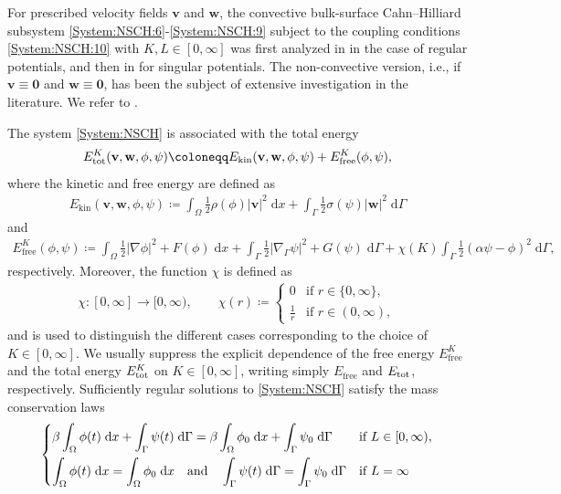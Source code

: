 \documentclass[11pt,reqno]{amsart}
\theoremstyle{remark}
\numberwithin{equation}{section}
\newcommand{\abs}[1]{|#1|}
\newcommand{\intO}{\int_\Omega}
\newcommand{\intG}{\int_\Gamma}
\newcommand{\dx}{\;\mathrm{d}x}
\newcommand{\dG}{\;\mathrm d\Ga}
\newcommand{\Grad}{\nabla}
\newcommand{\Gradg}{\nabla_\Ga}
\newcommand{\Ga}{\Gamma}
\newcommand{\bv}{\mathbf v}
\newcommand{\bw}{\mathbf w}
\newcommand{\tot}{\textup{tot}}
\newcommand{\free}{\mathrm{free}}
\begin{document}
For prescribed velocity fields $\bv$ and $\bw$, the convective bulk-surface Cahn--Hilliard subsystem \eqref{System:NSCH:6}-\eqref{System:NSCH:9} subject to the coupling conditions \eqref{System:NSCH:10} with $K,L\in[0,\infty]$ was first analyzed in \cite{Knopf2024} in the case of regular potentials, and then in \cite{Knopf2025a,Giorgini2026,Stange2026,Knopf2026} for singular potentials. The non-convective version, i.e., if $\bv\equiv\mathbf 0$ and $\bw\equiv\mathbf 0$, has been the subject of extensive investigation in the literature. We refer to \cite{Lv2024,Lv2024a,Lv2024b,Stange2026,Fukao2021,Colli2020,Goldstein2011,Liu2019,Knopf2020,Knopf2021a}.


The system \eqref{System:NSCH} is associated with the total energy
\begin{align*}
	E^K_\tot(\bv,\bw,\phi,\psi) \coloneqq E_{\mathrm{kin}}(\bv,\bw,\phi,\psi) + E_\free^K(\phi,\psi),
\end{align*}
where the kinetic and free energy are defined as
\begin{align*}
    E_{\mathrm{kin}}(\bv,\bw,\phi,\psi) \coloneqq \intO \frac12\rho(\phi)\abs{\bv}^2\dx + \intG \frac12\sigma(\psi)\abs{\bw}^2\dG
\end{align*}
and
\begin{align*}
    E_\free^K(\phi,\psi) \coloneqq \intO \frac12\abs{\Grad\phi}^2 + F(\phi)\dx + \intG \frac12\abs{\Gradg\psi}^2 + G(\psi)\dG + \chi(K)\intG \frac12(\alpha\psi - \phi)^2\dG,
\end{align*}
respectively.
Moreover, the function $\chi$ is defined as
\begin{align}\label{DEF:CHI}
    \chi:[0,\infty]\rightarrow[0,\infty), \qquad \chi(r) \coloneqq \begin{cases} 0 & \text{if~}r\in\{0,\infty\}, \\
    \frac1r &\text{if~}r\in(0,\infty),
    \end{cases}
\end{align}
and is used to distinguish the different cases corresponding to the choice of $K\in[0,\infty]$. We usually suppress the explicit dependence of the free energy $E_\free^K$ and the total energy $E_\tot^K$ on $K\in[0,\infty]$, writing simply $E_\free$ and $E_\tot$, respectively. Sufficiently regular solutions to \eqref{System:NSCH} satisfy the mass conservation laws
\begin{align}\label{Intro:MCL}
    \begin{dcases}
        \beta\intO \phi(t)\dx + \intG \psi(t)\dG = \beta\intO \phi_0 \dx + \intG \psi_0\dG &\textnormal{if~} L\in[0,\infty), \\
        \intO\phi(t)\dx = \intO\phi_0\dx \quad\textnormal{and}\quad \intG\psi(t)\dG = \intG\psi_0\dG &\textnormal{if~} L = \infty
    \end{dcases}
\end{align}
\end{document}
